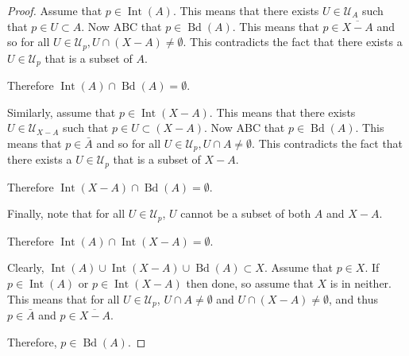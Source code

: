 \documentclass[letterpaper,12pt,fleqn]{article}
\newcommand{\U}{\mathcal{U}}
\DeclareMathOperator{\Int}{Int}
\DeclareMathOperator{\Bd}{Bd}
\begin{document}
\begin{proof}
  Assume that \(p\in\Int(A)\).  This means that there exists \(U\in\U_A\) such that \(p\in U\subset A\).  Now ABC
  that \(p\in\Bd(A)\).  This means that \(p\in\overline{X-A}\) and so for all \(U\in\U_p, U\cap(X-A)\ne\emptyset\).
  This contradicts the fact that there exists a \(U\in\U_p\) that is a subset of \(A\).

  Therefore \(\Int(A)\cap\Bd(A)=\emptyset\).

  Similarly, assume that \(p\in\Int(X-A)\).  This means that there exists \(U\in\U_{X-A}\) such that \(p\in
  U\subset(X-A)\).  Now ABC that \(p\in\Bd(A)\).  This means that \(p\in\bar{A}\) and so for all \(U\in\U_p, U\cap
  A\ne\emptyset\).  This contradicts the fact that there exists a \(U\in\U_p\) that is a subset of \(X-A\).

  Therefore \(\Int(X-A)\cap\Bd(A)=\emptyset\).

  Finally, note that for all \(U\in\U_p\), \(U\) cannot be a subset of both \(A\) and \(X-A\).

  Therefore \(\Int(A)\cap\Int(X-A)=\emptyset\).

  Clearly, \(\Int(A)\cup\Int(X-A)\cup\Bd(A)\subset X\).  Assume that \(p\in X\).  If \(p\in\Int(A)\) or
  \(p\in\Int(X-A)\) then done, so assume that \(X\) is in neither.  This means that for all \(U\in\U_p\),
  \(U\cap A\ne\emptyset\) and \(U\cap(X-A)\ne\emptyset\), and thus \(p\in\bar{A}\) and \(p\in\overline{X-A}\).

  Therefore, \(p\in\Bd(A)\).
\end{proof}
\end{document}
